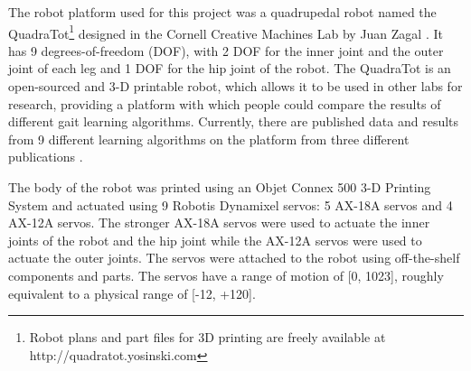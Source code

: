 The robot platform used for this project was a quadrupedal robot named the QuadraTot\footnote{Robot plans and part files for 3D printing are freely available at http://quadratot.yosinski.com} designed in the Cornell Creative Machines Lab by Juan Zagal \cite{yos:clune}.
It has 9 degrees-of-freedom (DOF), with 2 DOF for the inner joint and the outer joint of each leg and 1 DOF for the hip joint of the robot. 
The QuadraTot is an open-sourced and 3-D printable robot, which allows it to be used in other labs for research, providing a platform with which people could compare the results of different gait learning algorithms. 
Currently, there are published data and results from 9 different learning algorithms on the platform from three different publications \cite{yos:clune,glette,haocheng}. %


The body of the robot was printed using an Objet Connex 500 3-D Printing System and actuated using 9 Robotis Dynamixel servos: 5 AX-18A servos and 4 AX-12A servos. 
The stronger AX-18A servos were used to actuate the inner joints of the robot and the hip joint while the AX-12A servos were used to actuate the outer joints. 
The servos were attached to the robot using off-the-shelf components and parts.
The servos have a range of motion of [0, 1023], roughly equivalent to a physical range of [-12\degree, +120\degree]. 

